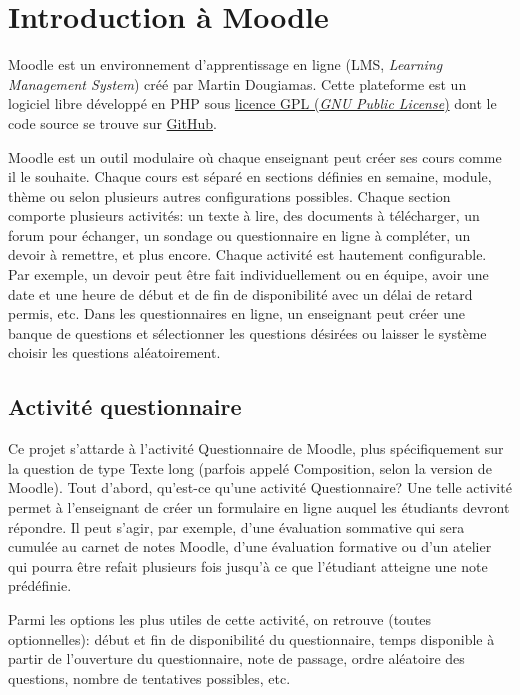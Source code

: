 \chapter{Introduction à Moodle}

Moodle est un environnement d'apprentissage en ligne (LMS, \textit{Learning Management System}) créé par Martin Dougiamas.
Cette plateforme est un logiciel libre développé en PHP sous \href{http://docs.moodle.org/dev/License}{licence GPL (\textit{GNU Public License})} dont le code source se trouve sur \href{https://github.com/moodle/moodle}{GitHub}.

Moodle est un outil modulaire où chaque enseignant peut créer ses cours comme il le souhaite.
Chaque cours est séparé en sections définies en semaine, module, thème ou selon plusieurs autres configurations possibles.
Chaque section comporte plusieurs activités: un texte à lire, des documents à télécharger, un forum pour échanger, un sondage ou questionnaire en ligne à compléter, un devoir à remettre, et plus encore.
Chaque activité est hautement configurable.
Par exemple, un devoir peut être fait individuellement ou en équipe, avoir une date et une heure de début et de fin de disponibilité avec un délai de retard permis, etc.
Dans les questionnaires en ligne, un enseignant peut créer une banque de questions et sélectionner les questions désirées ou laisser le système choisir les questions aléatoirement.

\section{Activité questionnaire}

Ce projet s'attarde à l'activité Questionnaire de Moodle, plus spécifiquement sur la question de type Texte long (parfois appelé Composition, selon la version de Moodle).
Tout d'abord, qu'est-ce qu'une activité Questionnaire?
Une telle activité permet à l'enseignant de créer un formulaire en ligne auquel les étudiants devront répondre.
Il peut s'agir, par exemple, d'une évaluation sommative qui sera cumulée au carnet de notes Moodle, d'une évaluation formative ou d'un atelier qui pourra être refait plusieurs fois jusqu'à ce que l'étudiant atteigne une note prédéfinie.

Parmi les options les plus utiles de cette activité, on retrouve (toutes optionnelles): début et fin de disponibilité du questionnaire, temps disponible à partir de l'ouverture du questionnaire, note de passage, ordre aléatoire des questions, nombre de tentatives possibles, etc.

